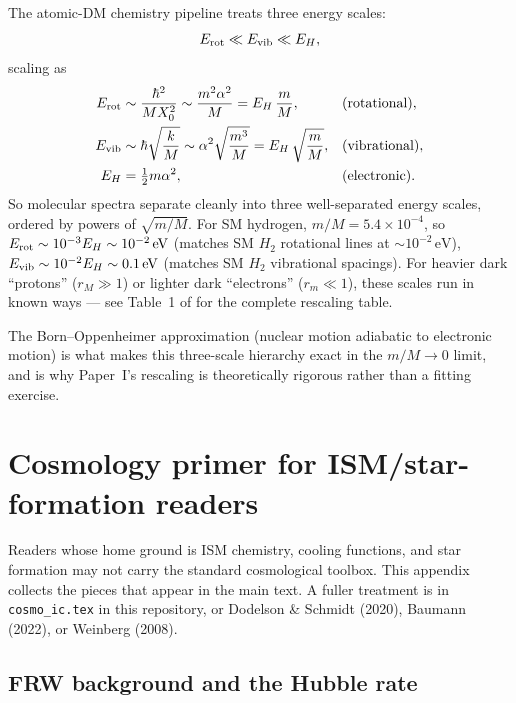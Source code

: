 \documentclass[12pt]{article}
\newcommand{\eV}{\,\mathrm{eV}}
\begin{document}
The atomic-DM chemistry pipeline treats three energy scales:
%
\begin{equation}
  E_{\rm rot} \ll E_{\rm vib} \ll E_H,
\end{equation}
%
scaling as
%
\begin{align}
  E_{\rm rot} &\sim \frac{\hbar^2}{M X_0^2}
      \sim \frac{m^2\alpha^2}{M}
      = E_H\,\frac{m}{M},
    &&\text{(rotational)}, \\
  E_{\rm vib} &\sim \hbar\sqrt{\frac{k}{M}}
      \sim \alpha^2\sqrt{\frac{m^3}{M}}
      = E_H\,\sqrt{\frac{m}{M}},
    &&\text{(vibrational)}, \\
  E_H  &= \tfrac{1}{2}m\alpha^2,
    &&\text{(electronic)}.
\end{align}
%
So molecular spectra separate cleanly into three well-separated
energy scales, ordered by powers of $\sqrt{m/M}$.  For SM hydrogen,
$m/M = 5.4\times 10^{-4}$, so $E_{\rm rot} \sim 10^{-3} E_H\sim
10^{-2}\eV$ (matches SM $H_2$ rotational lines at
$\sim 10^{-2}\eV$), $E_{\rm vib}\sim 10^{-2}E_H\sim 0.1\eV$
(matches SM $H_2$ vibrational spacings).  For heavier dark ``protons''
($r_M\gg 1$) or lighter dark ``electrons'' ($r_m\ll 1$), these scales
run in known ways --- see Table~1 of \citet{Ryan2022a} for the
complete rescaling table.

The Born--Oppenheimer approximation (nuclear motion adiabatic to
electronic motion) is what makes this three-scale hierarchy exact
in the $m/M \to 0$ limit, and is why Paper~I's rescaling is
theoretically rigorous rather than a fitting exercise.

\section{Cosmology primer for ISM/star-formation readers}
\label{app:cosmo_primer}

Readers whose home ground is ISM chemistry, cooling functions, and
star formation may not carry the standard cosmological toolbox.  This
appendix collects the pieces that appear in the main text.  A fuller
treatment is in \texttt{cosmo\_ic.tex} in this repository, or Dodelson
\& Schmidt (2020), Baumann (2022), or Weinberg (2008).

\subsection{FRW background and the Hubble rate}
\end{document}
